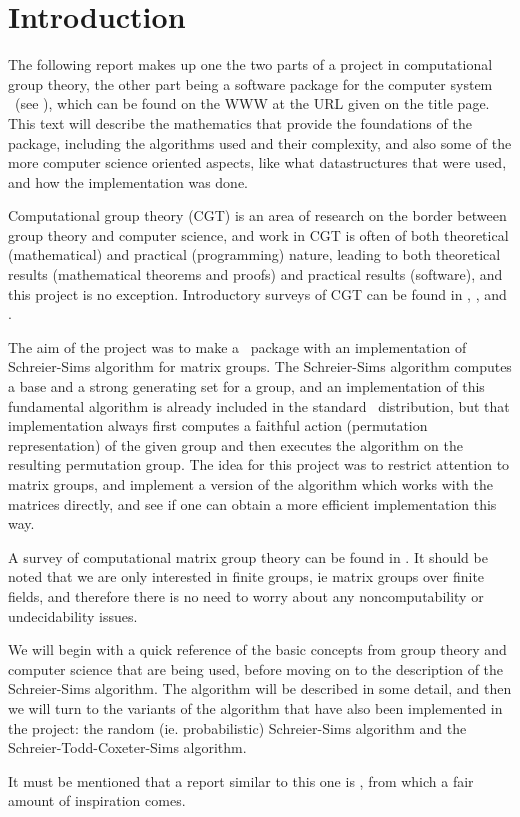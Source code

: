 \chapter{Introduction}
The following report makes up one the two parts of a project in
computational group theory, the other part being a software package
for the computer system \GAP~(see \cite{GAP}), which can be found on
the WWW at the URL given on the title page. This text will describe the mathematics that
provide the foundations of the package, including the algorithms used and their complexity,
and also some of the more computer science oriented aspects, like what
datastructures that were used, and how the implementation was done.

Computational group theory (CGT) is an area of research on the border
between group theory and computer science, and work in CGT
is often of both theoretical (mathematical) and practical
(programming) nature, leading to both theoretical results
(mathematical theorems and proofs) and practical results (software),
and this project is no exception. Introductory surveys of CGT can be
found in \cite{sims98}, \cite{seress97}, \cite{neubuser95} and \cite{cannon92}.

The aim of the project was to make a \GAP~package with an
implementation of Schreier-Sims algorithm for matrix groups. The Schreier-Sims algorithm computes a base and a strong generating set for a group, and an
implementation of this fundamental algorithm is already included in the
standard \GAP~distribution, but that implementation always first
computes a faithful action (permutation representation) of the given
group and then executes the algorithm on the resulting permutation
group. The idea for this project was to restrict attention to matrix
groups, and implement a version of the algorithm which works with the
matrices directly, and see if one can obtain a more efficient
implementation this way. 

A survey of computational matrix group theory can be found in
\cite{niemeyer01}. It should be noted that we are only interested in
finite groups, ie matrix groups over finite fields, and therefore
there is no need to worry about any noncomputability or undecidability
issues.

We will begin with a quick reference of the basic concepts from group
theory and computer science that are being used, before moving on to the description of
the Schreier-Sims algorithm. The algorithm will be described in some
detail, and then we will turn to the variants of the algorithm that have also
been implemented in the project: the random (ie. probabilistic)
Schreier-Sims algorithm and the Schreier-Todd-Coxeter-Sims algorithm.

It must be mentioned that a report similar to this one is \cite{murray93}, from which a fair amount of inspiration comes.
